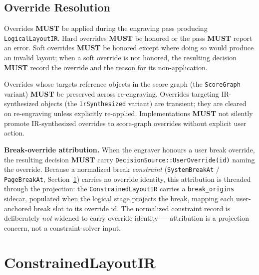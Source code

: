 \documentclass[11pt,letterpaper]{report}
\newcounter{requirement}[chapter]
\newcommand{\MUST}{\textbf{MUST}}
\begin{document}
\subsection{Override Resolution}

\begin{requirement}
  \label{req:layoutir:override-enforcement}
  Overrides \MUST{} be applied during the engraving pass producing
  \texttt{LogicalLayoutIR}. Hard overrides \MUST{} be honored or the
  pass \MUST{} report an error. Soft overrides \MUST{} be honored
  except where doing so would produce an invalid layout; when a soft
  override is not honored, the resulting decision \MUST{} record the
  override and the reason for its non-application.
\end{requirement}

\begin{requirement}
  \label{req:layoutir:override-target-lifetime}
  Overrides whose targets reference objects in the score graph (the
  \texttt{ScoreGraph} variant) \MUST{} be preserved across
  re-engraving. Overrides targeting IR-synthesized objects (the
  \texttt{IrSynthesized} variant) are transient; they are cleared on
  re-engraving unless explicitly re-applied. Implementations \MUST{}
  not silently promote IR-synthesized overrides to score-graph
  overrides without explicit user action.
\end{requirement}

\begin{requirement}
  \label{req:layoutir:break-origin-attribution}
  \textbf{Break-override attribution.} When the engraver honours a user break
  override, the resulting decision \MUST{} carry
  \texttt{DecisionSource::UserOverride(id)} naming the override. Because a
  normalized break \emph{constraint} (\texttt{SystemBreakAt} /
  \texttt{PageBreakAt}, Section~\ref{sec:layoutir:constrained}) carries no
  override identity, this attribution is threaded through the projection: the
  \texttt{ConstrainedLayoutIR} carries a \texttt{break\_origins} sidecar,
  populated when the logical stage projects the break, mapping each user-anchored
  break slot to its override id. The normalized constraint record is
  deliberately \emph{not} widened to carry override identity --- attribution is a
  projection concern, not a constraint-solver input.
\end{requirement}

\section{ConstrainedLayoutIR}
\label{sec:layoutir:constrained}
\end{document}
